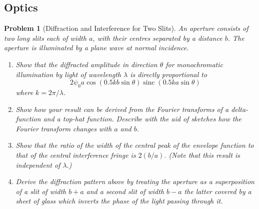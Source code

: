 \documentclass[a4paper]{article}
\DeclareMathOperator{\sinc}{sinc}
\theoremstyle{new}
\newtheorem{qns}{Problem}[section]
\begin{document}
\subsection{Optics}
\begin{qns}[Diffraction and Interference for Two Slits]
An aperture consists of two long slits each of width $a$, with their centres separated by a distance $b$. The aperture is illuminated by a plane wave at normal incidence.
\begin{enumerate}[label=(\roman*)]
\item Show that the diffracted amplitude in direction $\theta$ for monochromatic illumination by light of wavelength $\lambda$ is directly proportional to 
$$2\psi_0a\cos(0.5kb\sin\theta)\sinc(0.5ka\sin\theta)$$
where $k=2\pi/\lambda$.
\item Show how your result can be derived from the Fourier transforms of a delta-function and a top-hat function. Describe with the aid of sketches how the Fourier transform changes with $a$ and $b$.
\item Show that the ratio of the width of the central peak of the envelope function to that of the central interference fringe is $2(b/a)$. (Note that this result is independent of $\lambda$.)
\item Derive the diffraction pattern above by treating the aperture as a superposition of a slit of width $b+a$ and a second slit of width $b-a$ the latter covered by a sheet of glass which inverts the phase of the light passing through it.
\end{enumerate}
\end{qns}
\end{document}
